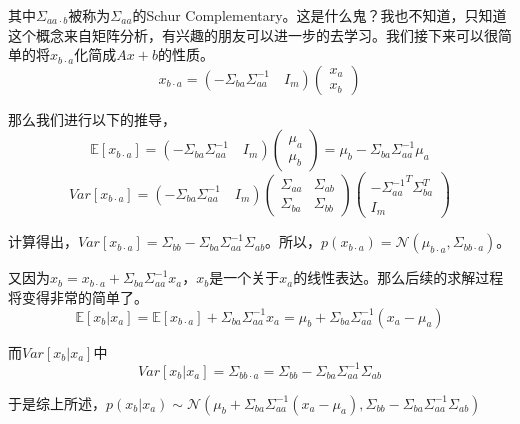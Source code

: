 \documentclass[a4paper]{article}
\begin{document}
其中$\Sigma_{aa\cdot b}$被称为$\Sigma_{aa}$的Schur Complementary。这是什么鬼？我也不知道，只知道这个概念来自矩阵分析，有兴趣的朋友可以进一步的去学习。我们接下来可以很简单的将$x_{b\cdot a}$化简成$Ax+b$的性质。
\begin{equation}
    x_{b\cdot a} = (-\Sigma_{ba}\Sigma_{aa}^{-1}\quad I_m)
    \begin{pmatrix}
        x_a \\
        x_b
    \end{pmatrix}
\end{equation}

那么我们进行以下的推导，
\begin{equation}
    \mathbb{E}[x_{b\cdot a}]= (-\Sigma_{ba}\Sigma_{aa}^{-1}\quad I_m)
    \begin{pmatrix}
        \mu_a \\
        \mu_b
    \end{pmatrix}
    =\mu_b-\Sigma_{ba}\Sigma_{aa}^{-1}\mu_a
\end{equation}
\begin{equation}
    Var[x_{b\cdot a}]=(-\Sigma_{ba}\Sigma_{aa}^{-1}\quad I_m)
    \begin{pmatrix}
    \Sigma_{aa} & \Sigma_{ab} \\
    \Sigma_{ba} & \Sigma_{bb} 
    \end{pmatrix}
    \begin{pmatrix}
        -{\Sigma_{aa}^{-1}}^T \Sigma_{ba}^T \\
        I_m
    \end{pmatrix}
\end{equation}

计算得出，$Var[x_{b\cdot a}]=\Sigma_{bb}-\Sigma_{ba}\Sigma_{aa}^{-1}\Sigma_{ab} $。所以，$p(x_{b\cdot a})=\mathcal{N}(\mu_{b\cdot a},\Sigma_{bb\cdot a})$。

又因为$x_b=x_{b\cdot a}+\Sigma_{ba}\Sigma_{aa}^{-1}x_a$，$x_b$是一个关于$x_a$的线性表达。那么后续的求解过程将变得非常的简单了。
\begin{equation}
    \mathbb{E}[x_b|x_a]=\mathbb{E}[x_{b\cdot a}] + \Sigma_{ba}\Sigma_{aa}^{-1}x_a = \mu_b+\Sigma_{ba}\Sigma_{aa}^{-1}(x_a-\mu_a)
\end{equation}

而$Var[x_b|x_a]$中
\begin{equation}
    Var[x_b|x_a] = \Sigma_{bb \cdot a} = \Sigma_{bb}-\Sigma_{ba}\Sigma_{aa}^{-1}\Sigma_{ab}
\end{equation}

于是综上所述，$p(x_b|x_a) \sim \mathcal{N}(\mu_b+\Sigma_{ba}\Sigma_{aa}^{-1}(x_a-\mu_a), \Sigma_{bb}-\Sigma_{ba}\Sigma_{aa}^{-1}\Sigma_{ab})$
\end{document}
